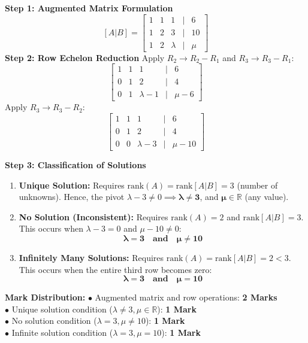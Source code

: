 \begin{solutionbox}
\textbf{Step 1: Augmented Matrix Formulation}
\[
[A|B] = \begin{bmatrix}
1 & 1 & 1 & | & 6 \\
1 & 2 & 3 & | & 10 \\
1 & 2 & \lambda & | & \mu
\end{bmatrix}
\]
\textbf{Step 2: Row Echelon Reduction}
Apply $R_2 \to R_2 - R_1$ and $R_3 \to R_3 - R_1$:
\[
\begin{bmatrix}
1 & 1 & 1 & | & 6 \\
0 & 1 & 2 & | & 4 \\
0 & 1 & \lambda-1 & | & \mu-6
\end{bmatrix}
\]
Apply $R_3 \to R_3 - R_2$:
\[
\begin{bmatrix}
1 & 1 & 1 & | & 6 \\
0 & 1 & 2 & | & 4 \\
0 & 0 & \lambda-3 & | & \mu-10
\end{bmatrix}
\]

\textbf{Step 3: Classification of Solutions}
\begin{enumerate}[label=(\roman*), leftmargin=6mm]
    \item \textbf{Unique Solution:}
    Requires $\text{rank}(A) = \text{rank}[A|B] = 3$ (number of unknowns).
    Hence, the pivot $\lambda - 3 \neq 0 \implies \mathbf{\lambda \neq 3}$, and $\mathbf{\mu \in \mathbb{R}}$ (any value).
    \item \textbf{No Solution (Inconsistent):}
    Requires $\text{rank}(A) = 2$ and $\text{rank}[A|B] = 3$.
    This occurs when $\lambda - 3 = 0$ and $\mu - 10 \neq 0$:
    \[
    \mathbf{\lambda = 3 \quad \text{and} \quad \mu \neq 10}
    \]
    \item \textbf{Infinitely Many Solutions:}
    Requires $\text{rank}(A) = \text{rank}[A|B] = 2 < 3$.
    This occurs when the entire third row becomes zero:
    \[
    \mathbf{\lambda = 3 \quad \text{and} \quad \mu = 10}
    \]
\end{enumerate}

\begin{markingrubric}
\textbf{Mark Distribution:}
$\bullet$ Augmented matrix and row operations: \textbf{2 Marks}\\
$\bullet$ Unique solution condition ($\lambda \neq 3, \mu \in \mathbb{R}$): \textbf{1 Mark}\\
$\bullet$ No solution condition ($\lambda = 3, \mu \neq 10$): \textbf{1 Mark}\\
$\bullet$ Infinite solution condition ($\lambda = 3, \mu = 10$): \textbf{1 Mark}
\end{markingrubric}
\end{solutionbox}

